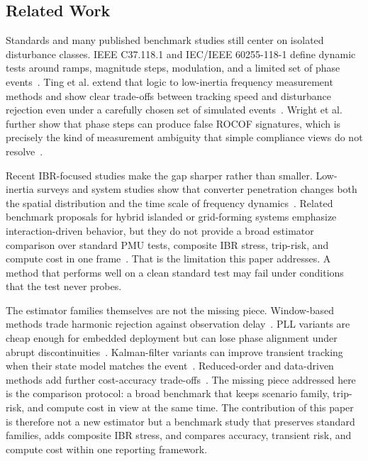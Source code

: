 \subsection{Related Work}
\label{sec:related}

Standards and many published benchmark studies still center on isolated
disturbance classes. IEEE C37.118.1 and IEC/IEEE 60255-118-1 define dynamic
tests around ramps, magnitude steps, modulation, and a limited set of phase
events~\cite{IEEE_C37_118,IEC_IEEE_60255_118_1_2018}. Ting et al. extend that
logic to low-inertia frequency measurement methods and show clear trade-offs
between tracking speed and disturbance rejection even under a carefully chosen
set of simulated events~\cite{Ting2022}. Wright et al. further show that phase
steps can produce false ROCOF signatures, which is precisely the kind of
measurement ambiguity that simple compliance views do not resolve~\cite{Wright2019}.

Recent IBR-focused studies make the gap sharper rather than smaller.
Low-inertia surveys and system studies show that converter penetration changes
both the spatial distribution and the time scale of frequency dynamics~\cite{Milano2018LowInertia,
Pinheiro2025,Ponce2025}. Related benchmark proposals for hybrid islanded or
grid-forming systems emphasize interaction-driven behavior, but they do not
provide a broad estimator comparison over standard PMU tests, composite IBR
stress, trip-risk, and compute cost in one frame~\cite{Bernal2025,Zoghby2024}.
That is the limitation this paper addresses. A method that performs well on a
clean standard test may fail under conditions that the test never probes.

The estimator families themselves are not the missing piece. Window-based
methods trade harmonic rejection against observation delay~\cite{Belega2014,
PlatasGarza2011}. PLL variants are cheap enough for embedded deployment but can
lose phase alignment under abrupt discontinuities~\cite{Golestan2017,Wright2019}.
Kalman-filter variants can improve transient tracking when their state model
matches the event~\cite{Ferrero2020EKF,Chamorro2021}. Reduced-order and
data-driven methods add further cost-accuracy trade-offs~\cite{Netto2018KoopmanKF}.
The missing piece addressed here is the comparison protocol: a broad benchmark
that keeps
scenario family, trip-risk, and compute cost in view at the same time. The
contribution of this paper is therefore not a new estimator but a benchmark
study that preserves standard families, adds composite IBR stress, and compares
accuracy, transient risk, and compute cost within one reporting framework.
